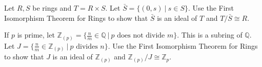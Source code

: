 
\newcommand{\C}{\mathbb{C}}
\newcommand{\Q}{\mathbb{Q}}
\newcommand{\R}{\mathbb{R}}
\newcommand{\Z}{\mathbb{Z}}


Let $R,S$ be rings and $T=R\times S$.  Let $\bar S=\{(0,s) \ |\ s\in S\}$.
		Use the First Isomorphism Theorem for Rings to show that $\bar S$ is an ideal of $T$ and $T/\bar S\cong R$.
	

If $p$ is prime, let $\Z_{(p)}=\{\frac{n}{m}\in \Q\ |\ p\text{ does not divide }m\}$.  This is a subring of $\Q$.  Let $J=\{\frac{n}{m}\in \Z_{(p)}\ |\ p\text{ divides }n\}$.  Use the First Isomorphism Theorem for Rings to show that $J$ is an ideal of $\Z_{(p)}$ and $\Z_{(p)}/J\cong \Z_p$.